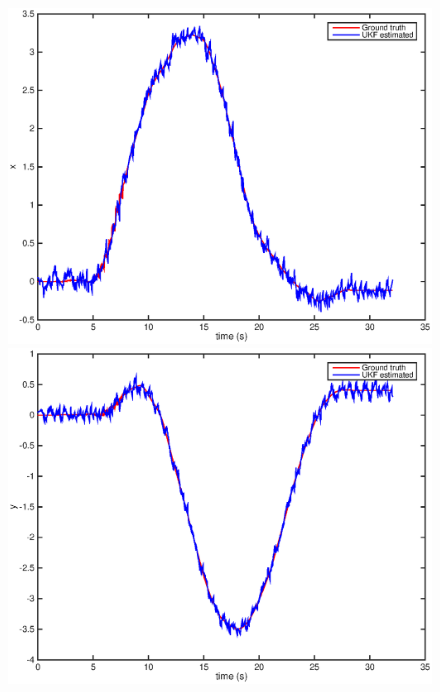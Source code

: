 \documentclass[letter, 10pt]{article}
\begin{document}
\begin{onehalfspacing}
\begin{figure}[h]
	\centering
	\begin{minipage}{.25\textwidth} 
  		\centering
    		\includegraphics[width=1\linewidth]{q_x.eps}
	\end{minipage}%
	\begin{minipage}{.25\textwidth} 
		\centering
    		\includegraphics[width=1\linewidth]{q_y.eps}
	\end{minipage}%
	\begin{minipage}{.25\textwidth}  		
		\centering

\end{minipage}
\end{figure}
\end{onehalfspacing}
\end{document}
